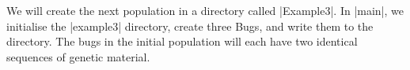 We will create the next population in a directory called |Example3|.
In |main|, we initialise the |example3| directory, create three Bugs,
and write them to the directory.
The bugs in the initial population will each have two identical
sequences of genetic material.


